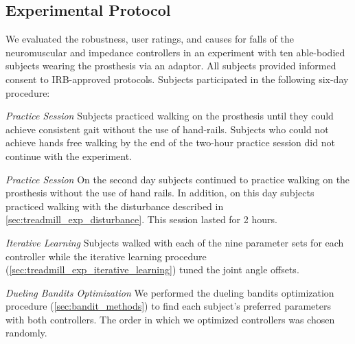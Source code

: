 \subsection{Experimental Protocol}

We evaluated the robustness, user ratings, and causes for falls of the
neuromuscular and impedance controllers in an experiment with ten able-bodied
subjects wearing the prosthesis via an adaptor. All subjects provided informed
consent to IRB-approved protocols. Subjects participated in the following
six-day procedure:


\begin{days}
    \item\label{list:exp_day_1} \emph{Practice Session} Subjects practiced
    walking on the prosthesis until they could achieve consistent gait without
    the use of hand-rails. Subjects who could not achieve hands free walking by
    the end of the two-hour practice session did not continue with the
    experiment.

    \item\label{list:exp_day_2} \emph{Practice Session} On the second day
    subjects continued to practice walking on the prosthesis without the use of
    hand rails. In addition, on this day subjects practiced walking with the
    disturbance described in \cref{sec:treadmill_exp_disturbance}. This session
    lasted for 2 hours.

    \item\label{list:exp_day_3} \emph{Iterative Learning} Subjects walked with
    each of the nine parameter sets for each controller while the iterative
    learning procedure (\cref{sec:treadmill_exp_iterative_learning}) tuned the
    joint angle offsets. 

    \item\label{list:exp_day_4} \emph{Dueling Bandits Optimization} We performed
    the dueling bandits optimization procedure (\cref{sec:bandit_methods}) to
    find each subject's preferred parameters with both controllers. The order in
    which we optimized controllers was chosen randomly.


\end{days}
